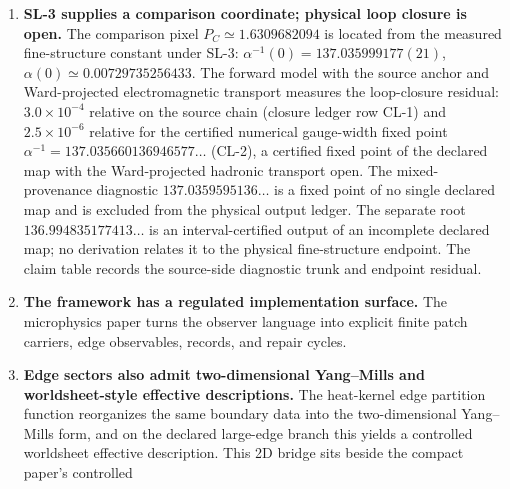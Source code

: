 \documentclass[11pt]{article}
\newcommand{\U}{\mathrm{U}}
\begin{document}
\begin{enumerate}[leftmargin=2em]
refinement conditions, edge sectors reconstruct a bosonic compact-gauge branch. The overlap/holonomy calculus classifies transportable sectors; it does not by itself choose the Standard Model. The realized low-energy branch
with the explicit one-generation/one-Higgs matter package and MAR then selects the compact gauge quotient, exact hypercharge,
three generations, three colors, and the structural absence of the simple-GUT
\(X/Y\) gauge channel. General proton stability is not implied. On the ordinary electromagnetic branch, the unbroken
\(\U(1)_Q\) factor reduces the compact-gauge curvature to \(F_Q=dA_Q\); after separately
assuming the low-energy Maxwell action and its nonzero kinetic term, variation gives
\(dF_Q=0\) and \(d{*}F_Q=g_Q^2{*}J_Q\), i.e. Maxwell's equations after
canonical electromagnetic normalization.
\item \textbf{SL-3 supplies a comparison coordinate; physical loop closure is open.} The
comparison pixel
\(P_C\simeq1.6309682094\) is located from the measured fine-structure constant under SL-3:
\(\alpha^{-1}(0)=137.035999177(21)\),
\(\alpha(0)\simeq0.00729735256433\). The forward model with
the source anchor and Ward-projected electromagnetic transport measures the
loop-closure residual: \(3.0\times10^{-4}\) relative on the source chain (closure ledger row
CL-1) and \(2.5\times10^{-6}\) relative for the certified numerical gauge-width
fixed point \(\alpha^{-1}=137.035660136946577\ldots\) (CL-2), a certified fixed point of the
declared map with the Ward-projected hadronic transport open. The mixed-provenance diagnostic
\(137.0359595136\ldots\) is a fixed point of no single declared map and is excluded from the
physical output ledger. The separate root \(136.994835177413\ldots\) is an interval-certified
output of an incomplete declared map; no derivation relates it to the physical fine-structure
endpoint.
The claim table
records the source-side diagnostic trunk and endpoint residual.
\item \textbf{The framework has a regulated implementation surface.} The microphysics paper turns
the observer language into explicit finite patch carriers, edge observables, records, and repair
cycles.
\item \textbf{Edge sectors also admit two-dimensional Yang--Mills and worldsheet-style effective descriptions.} The heat-kernel
edge partition function reorganizes the same boundary data into the two-dimensional
Yang--Mills form, and on the declared large-edge branch this yields a controlled worldsheet
effective description. This 2D bridge sits beside the compact paper's controlled

\end{enumerate}
\end{document}
